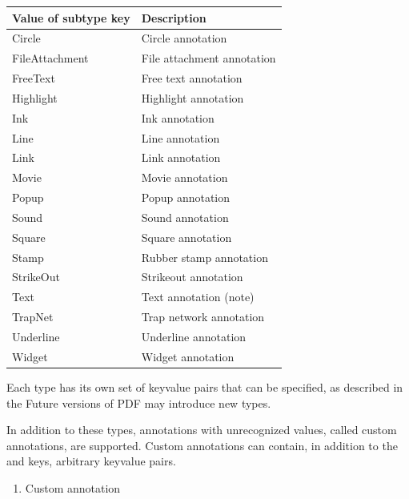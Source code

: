 \documentclass[letterpaper,12pt,english,openany,oneside]{sphinxmanual}
\begin{document}
\begin{savenotes}\sphinxattablestart
\centering
{}\label{\detokenize{pdfmark_Basic:section-1}}\nobreak
\begin{tabulary}{\linewidth}[t]{|T|T|}
\hline
\sphinxstyletheadfamily 
Value of subtype key
&\sphinxstyletheadfamily 
Description
\\
\hline
Circle
&
Circle annotation
\\
\hline
FileAttachment
&
File attachment annotation
\\
\hline
FreeText
&
Free text annotation
\\
\hline
Highlight
&
Highlight annotation
\\
\hline
Ink
&
Ink annotation
\\
\hline
Line
&
Line annotation
\\
\hline
Link
&
Link annotation
\\
\hline
Movie
&
Movie annotation
\\
\hline
Popup
&
Pop\sphinxhyphen{}up annotation
\\
\hline
Sound
&
Sound annotation
\\
\hline
Square
&
Square annotation
\\
\hline
Stamp
&
Rubber stamp annotation
\\
\hline
StrikeOut
&
Strikeout annotation
\\
\hline
Text
&
Text annotation (note)
\\
\hline
TrapNet
&
Trap network annotation
\\
\hline
Underline
&
Underline annotation
\\
\hline
Widget
&
Widget annotation
\\
\hline
\end{tabulary}
\par
\sphinxattableend\end{savenotes}

Each type has its own set of key\sphinxhyphen{}value pairs that can be specified, as described in the  Future versions of PDF may introduce new types.

In addition to these types, annotations with unrecognized  values, called custom annotations, are supported. Custom annotations can contain, in addition to the  and  keys, arbitrary key\sphinxhyphen{}value pairs.
\begin{enumerate}
%
\item {} 
Custom annotation

\end{enumerate}
\end{document}
